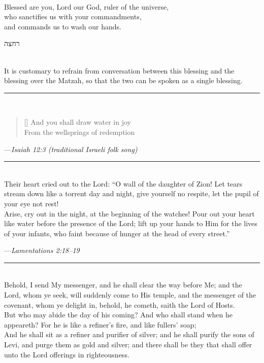 \documentclass[letter,11pt,openany]{memoir}
\newcommand{\HgSource}[1]{\hfill{\small---\itshape{#1}}}
\newcommand{\hchapter}[1]{
  \begin{hebrew}
    \begin{Spacing}{.97}
      \newpage
      \strut

      \vspace{.15em}

      \begin{flushleft}
      \noindent\Huge #1
      \end{flushleft}

      \vspace{1em}
    \end{Spacing}
  \end{hebrew}
}
\newcommand{\HgFill}{\vfill \hrule \vfill}
\newenvironment{HgEnglish}{\strut\\\noindent}{\vspace{1em}}
\newcommand{\LSrc}{\textsuperscript{\upshape{[L]}}}
\begin{document}
\begin{HgEnglish}
  Blessed are you, Lord our God, ruler of the universe, \\
  who sanctifies us with your commandments, \\
  and commands us to wash our hands.
\end{HgEnglish}

\vfill

\hchapter{רחצה}

\begin{HgEnglish}
It is customary to refrain from conversation between this blessing and the
blessing over the Matzah, so that the two can be spoken as a single blessing.
\end{HgEnglish}

\HgFill

\begin{HgEnglish}
  \settowidth{\versewidth}{From the wellsprings of redemption}
  \begin{verse}[\versewidth]
    And you shall draw water in joy \\
    From the wellsprings of redemption
  \end{verse}
  \HgSource{Isaiah 12:3 (traditional Israeli folk song)}
\end{HgEnglish}

\HgFill

\begin{HgEnglish}
  Their heart cried out to the Lord: ``O wall of the daughter of Zion! Let tears
  stream down like a torrent day and night, give yourself no respite, let the
  pupil of your eye not rest!\\

  \noindent Arise, cry out in the night, at the beginning of the watches! Pour out your
  heart like water before the presence of the Lord; lift up your hands to Him
  for the lives of your infants, who faint because of hunger at the
  head of every street.''
\end{HgEnglish}

\HgSource{Lamentations 2:18--19 \LSrc}

\HgFill

\begin{HgEnglish}
  Behold, I send My messenger, and he shall clear the way before Me; and the
  Lord, whom ye seek, will suddenly come to His temple, and the messenger of the
  covenant, whom ye delight in, behold, he cometh, saith the Lord of Hosts.\\

  \noindent
  But who may abide the day of his coming? And who shall stand when he
  appeareth? For he is like a refiner's fire, and like fullers' soap;\\
  
  \noindent
  And he shall sit as a refiner and purifier of silver; and he shall purify the
  sons of Levi, and purge them as gold and silver; and there shall be they that
  shall offer unto the Lord offerings in righteousness.
\end{HgEnglish}
\end{document}
